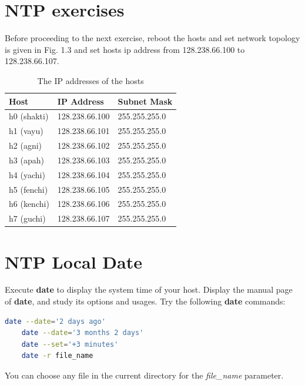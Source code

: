 \documentclass[10pt,a4paper]{article}
\numberwithin{equation}{section}
\numberwithin{figure}{section}
\numberwithin{table}{section}
\begin{document}
\section*{NTP exercises}
    Before proceeding to the next exercise, reboot the hosts and set network topology is given in Fig. 1.3 and set hosts ip address from 128.238.66.100 to 128.238.66.107.
    \begin{center}
        \begin{minipage}{0.48\textwidth}
            \begin{flushleft}
                \begin{table}[H]
                    \caption{The IP addresses of the hosts}
                    \vspace{5pt}
                    \centering
                    \large
                    \begin{tabular}{ l l l }
                        \hline \hline
                        Host & IP Address & Subnet Mask \\
                        \hline 
                        h0 (shakti) & 128.238.66.100 & 255.255.255.0 \\
                        h1 (vayu) & 128.238.66.101 & 255.255.255.0 \\
                        h2 (agni) & 128.238.66.102 & 255.255.255.0 \\
                        h3 (apah) & 128.238.66.103 & 255.255.255.0 \\
                        h4 (yachi) & 128.238.66.104 & 255.255.255.0 \\
                        h5 (fenchi) & 128.238.66.105 & 255.255.255.0 \\
                        h6 (kenchi) & 128.238.66.106 & 255.255.255.0 \\
                        h7 (guchi) & 128.238.66.107 & 255.255.255.0 \\
                        \hline \hline
                        \end{tabular}
                \end{table}
            \end{flushleft}
        \end{minipage}
    \end{center}

\section{NTP Local Date}
    Execute \textbf{date} to display the system time of your host. Display the manual page of \textbf{date}, and study its options and usages.
    Try the following \textbf{date} commands: \\
    \begin{lstlisting}[language=bash,
        basicstyle=\ttfamily,
        showstringspaces=false,
        commentstyle=\color{green},
        keywordstyle=\color{black}]
    date --date='2 days ago'
    date --date='3 months 2 days'
    date --set='+3 minutes'
    date -r file_name
    \end{lstlisting}
    You can choose any file in the current directory for the \textit{file\_name} parameter.
\end{document}
